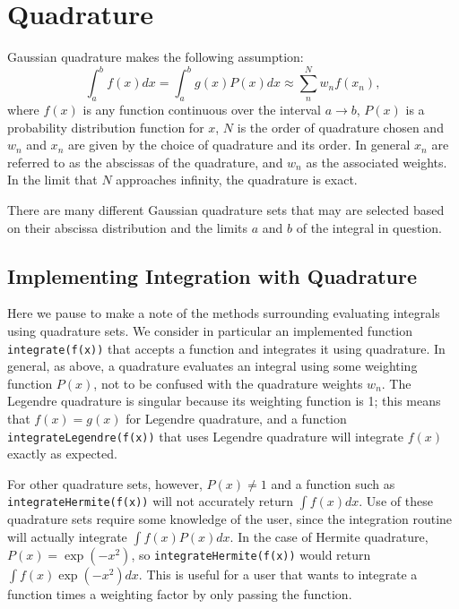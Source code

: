 \documentclass[11pt]{article} %
\begin{document}
\section{Quadrature}
Gaussian quadrature makes the following assumption:
\begin{equation}
  \int_a^b f(x)dx=\int_a^b g(x) P(x)dx\approx\sum_n^N w_n f(x_n),
\end{equation}
where $f(x)$ is any function continuous over the interval $a\to b$, $P(x)$ is a probability distribution function for $x$, $N$ is the order of quadrature chosen and $w_n$ and $x_n$ are given by the choice of quadrature and its order.  In general $x_n$ are referred to as the abscissas of the quadrature, and $w_n$ as the associated weights.  In the limit that $N$ approaches infinity, the quadrature is exact. 

There are many different Gaussian quadrature sets that may are selected based on their abscissa distribution and the limits $a$ and $b$ of the integral in question.

\subsection{Implementing Integration with Quadrature}
Here we pause to make a note of the methods surrounding evaluating integrals using quadrature sets.  We consider in particular an implemented function \texttt{integrate(f(x))} that accepts a function and integrates it using quadrature.  In general, as above, a quadrature evaluates an integral using some weighting function $P(x)$, not to be confused with the quadrature weights $w_n$.  The Legendre quadrature is singular because its weighting function is 1; this means that $f(x)=g(x)$ for Legendre quadrature, and a function \texttt{integrateLegendre(f(x))} that uses Legendre quadrature will integrate $f(x)$ exactly as expected.

For other quadrature sets, however, $P(x)\neq 1$ and a function such as \texttt{integrateHermite(f(x))} will not accurately return $\int f(x) dx$.  Use of these quadrature sets require some knowledge of the user, since the integration routine will actually integrate $\int f(x) P(x)dx$.  In the case of Hermite quadrature, $P(x)=\exp(-x^2)$, so \texttt{integrateHermite(f(x))} would return $\int f(x)\exp(-x^2) dx$.  This is useful for a user that wants to integrate a function times a weighting factor by only passing the function.
\end{document}
